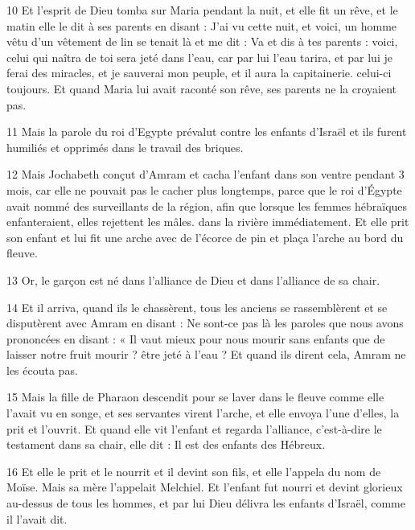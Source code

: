 \par 10 Et l'esprit de Dieu tomba sur Maria pendant la nuit, et elle fit un rêve, et le matin elle le dit à ses parents en disant : J'ai vu cette nuit, et voici, un homme vêtu d'un vêtement de lin se tenait là et me dit : Va et dis à tes parents : voici, celui qui naîtra de toi sera jeté dans l'eau, car par lui l'eau tarira, et par lui je ferai des miracles, et je sauverai mon peuple, et il aura la capitainerie. celui-ci toujours. Et quand Maria lui avait raconté son rêve, ses parents ne la croyaient pas.

\par 11 Mais la parole du roi d'Egypte prévalut contre les enfants d'Israël et ils furent humiliés et opprimés dans le travail des briques.

\par 12 Mais Jochabeth conçut d'Amram et cacha l'enfant dans son ventre pendant 3 mois, car elle ne pouvait pas le cacher plus longtemps, parce que le roi d'Égypte avait nommé des surveillants de la région, afin que lorsque les femmes hébraïques enfanteraient, elles rejettent les mâles. dans la rivière immédiatement. Et elle prit son enfant et lui fit une arche avec de l'écorce de pin et plaça l'arche au bord du fleuve.

\par 13 Or, le garçon est né dans l'alliance de Dieu et dans l'alliance de sa chair.

\par 14 Et il arriva, quand ils le chassèrent, tous les anciens se rassemblèrent et se disputèrent avec Amram en disant : Ne sont-ce pas là les paroles que nous avons prononcées en disant : « Il vaut mieux pour nous mourir sans enfants que de laisser notre fruit mourir ? être jeté à l’eau ? Et quand ils dirent cela, Amram ne les écouta pas.

\par 15 Mais la fille de Pharaon descendit pour se laver dans le fleuve comme elle l'avait vu en songe, et ses servantes virent l'arche, et elle envoya l'une d'elles, la prit et l'ouvrit. Et quand elle vit l'enfant et regarda l'alliance, c'est-à-dire le testament dans sa chair, elle dit : Il est des enfants des Hébreux.

\par 16 Et elle le prit et le nourrit et il devint son fils, et elle l'appela du nom de Moïse. Mais sa mère l'appelait Melchiel. Et l'enfant fut nourri et devint glorieux au-dessus de tous les hommes, et par lui Dieu délivra les enfants d'Israël, comme il l'avait dit.

